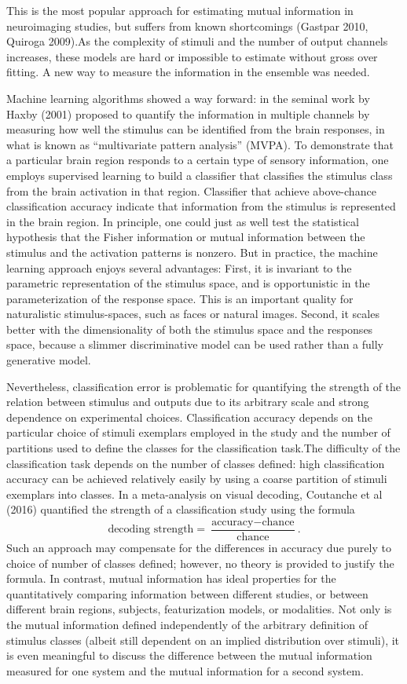 \documentclass[12pt]{article}
\begin{document}
This is the most popular approach for estimating mutual information in
neuroimaging studies, but suffers from known shortcomings (Gastpar
2010, Quiroga 2009).As the complexity of stimuli and the number of
output channels increases, these models are hard or impossible to
estimate without gross over fitting. A new way to measure the
information in the ensemble was needed.
 
Machine learning algorithms showed a way forward: in the seminal work
by Haxby (2001) proposed to quantify the information in multiple
channels by measuring how well the stimulus can be identified from the
brain responses, in what is known as ``multivariate pattern analysis''
(MVPA). To demonstrate that a particular brain region responds to a
certain type of sensory information, one employs supervised learning
to build a classifier that classifies the stimulus class from the
brain activation in that region. Classifier that achieve above-chance
classification accuracy indicate that information from the stimulus is
represented in the brain region. In principle, one could just as well
test the statistical hypothesis that the Fisher information or mutual
information between the stimulus and the activation patterns is
nonzero. But in practice, the machine learning approach enjoys several
advantages: First, it is invariant to the parametric representation of
the stimulus space, and is opportunistic in the parameterization of
the response space. This is an important quality for naturalistic
stimulus-spaces, such as faces or natural images. Second, it scales
better with the dimensionality of both the stimulus space and the
responses space, because a slimmer discriminative model can be used
rather than a fully generative model.

Nevertheless, classification error is problematic for quantifying the
strength of the relation between stimulus and outputs due to its
arbitrary scale and strong dependence on experimental
choices. Classification accuracy depends on the particular choice of
stimuli exemplars employed in the study and the number of partitions
used to define the classes for the classification task.The difficulty
of the classification task depends on the number of classes defined:
high classification accuracy can be achieved relatively easily by
using a coarse partition of stimuli exemplars into classes. In a
meta-analysis on visual decoding, Coutanche et al (2016) quantified
the strength of a classification study using the formula
\[
\text{decoding strength} = \frac{\text{accuracy} - \text{chance}}{\text{chance}}.
\]
Such an approach may compensate for the differences in accuracy due
purely to choice of number of classes defined; however, no theory is
provided to justify the formula. In contrast, mutual information has
ideal properties for the quantitatively comparing information between
different studies, or between different brain regions, subjects,
featurization models, or modalities. Not only is the mutual
information defined independently of the arbitrary definition of
stimulus classes (albeit still dependent on an implied distribution
over stimuli), it is even meaningful to discuss the difference between
the mutual information measured for one system and the mutual
information for a second system.
\end{document}
